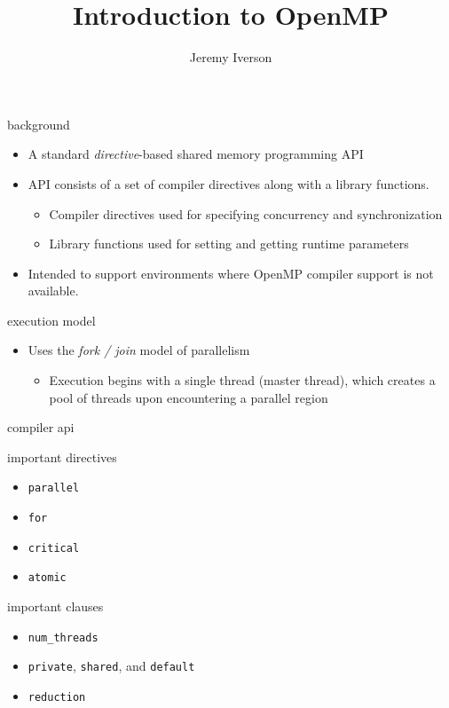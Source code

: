 \documentclass[10pt,t]{beamer}
\title{Introduction to OpenMP}
\date{}
\author{Jeremy Iverson}
\institute{College of Saint Benedict \& Saint John's University}
\begin{document}
  \maketitle

  \begin{frame}{background}
    \begin{itemize}
      \item A standard \emph{directive}-based shared memory programming API
      \item API consists of a set of compiler directives along with a library
        functions.
        \begin{itemize}
          \item Compiler directives used for specifying concurrency and
            synchronization
          \item Library functions used for setting and getting runtime
            parameters
        \end{itemize}
      \item Intended to support environments where OpenMP compiler support is
        not available.
    \end{itemize}
  \end{frame}

  \begin{frame}{execution model}
    \begin{itemize}
      \item Uses the \emph{fork / join} model of parallelism
        \begin{itemize}
          \item Execution begins with a single thread (master thread), which
            creates a pool of threads upon encountering a parallel region
        \end{itemize}
    \end{itemize}
  \end{frame}

  \begin{frame}{compiler api}
    \begin{block}{important directives}
      \begin{itemize}
        \item \texttt{parallel}
        \item \texttt{for}
        \item \texttt{critical}
        \item \texttt{atomic}
      \end{itemize}
    \end{block}

    \begin{block}{important clauses}
      \begin{itemize}
        \item \texttt{num\_threads}
        \item \texttt{private}, \texttt{shared}, and \texttt{default}
        \item \texttt{reduction}
      \end{itemize}
    \end{block}
  \end{frame}
\end{document}
